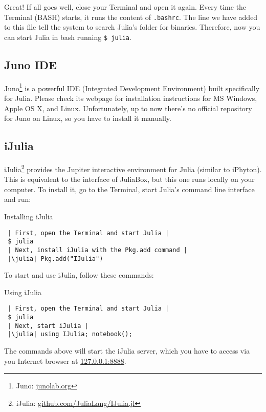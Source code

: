 Great! If all goes well, close your Terminal and open it again. Every time the Terminal (BASH) starts, it runs the content of \texttt{.bashrc}. The line we have added to this file tell the system to search Julia's folder for binaries. Therefore, now you can start Julia in bash running \texttt{\$ julia}.

\subsection{Juno IDE}

Juno\footnote{Juno: \url{junolab.org}} is a powerful IDE (Integrated Development Environment) built specifically for Julia. Please check its webpage for installation instructions for MS Windows, Apple OS X, and Linux. Unfortunately, up to now there's no official repository for Juno on Linux, so you have to install it manually.

\subsection{iJulia}

iJulia\footnote{iJulia: \url{github.com/JuliaLang/IJulia.jl}} provides the Jupiter interactive environment for Julia (similar to iPhyton). This is equivalent to the interface of JuliaBox, but this one runs locally on your computer. To install it, go to the Terminal, start Julia's command line interface and run:

\begin{example}{Installing iJulia}
\begin{verbatim}
 | First, open the Terminal and start Julia |
 $ julia
 | Next, install iJulia with the Pkg.add command |
 |\julia| Pkg.add("IJulia")
\end{verbatim}
\end{example}

To start and use iJulia, follow these commands:

\begin{example}{Using iJulia}
\begin{verbatim}
 | First, open the Terminal and start Julia |
 $ julia
 | Next, start iJulia |
 |\julia| using IJulia; notebook();
\end{verbatim}
\end{example}

The commands above will start the iJulia server, which you have to access via you Internet browser at \url{127.0.0.1:8888}.

